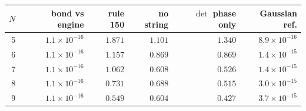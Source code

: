 \begin{tabular}{rrrrrr}
\hline
$N$ & bond vs engine & rule 150 & no string & $\det$ phase only & Gaussian ref. \\
\hline
5 & $1.1\times10^{-16}$ & $1.871$ & $1.101$ & $1.340$ & $8.9\times10^{-16}$ \\
6 & $1.1\times10^{-16}$ & $1.157$ & $0.869$ & $0.869$ & $1.4\times10^{-15}$ \\
7 & $1.1\times10^{-16}$ & $1.062$ & $0.608$ & $0.526$ & $1.4\times10^{-15}$ \\
8 & $1.1\times10^{-16}$ & $0.731$ & $0.688$ & $0.515$ & $3.0\times10^{-15}$ \\
9 & $1.1\times10^{-16}$ & $0.549$ & $0.604$ & $0.427$ & $3.7\times10^{-15}$ \\
\hline
\end{tabular}
